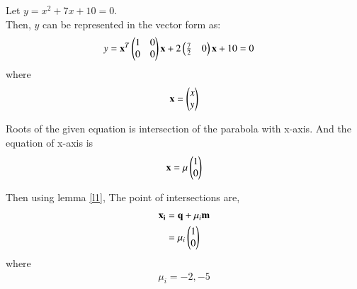 \documentclass[journal,12pt,twocolumn]{IEEEtran}
\begin{document}
Let $y = x^2+7x+10 = 0$. \\Then, $y$ can be represented in the vector form as:
\begin{align}
     y = \mathbf{x}^T\begin{pmatrix}1 & 0 \\ 0 & 0\end{pmatrix}\mathbf{x} + 2\begin{pmatrix}\frac{7}{2} & 0\end{pmatrix}\mathbf{x} + 10 &= 0\label{eq:2}
\end{align}
where 
\begin{align}
    \mathbf{x} = \begin{pmatrix}x\\y\end{pmatrix}
\end{align}

Roots of the given equation is intersection of the parabola with x-axis.
And the equation of x-axis is
\begin{align}
    \mathbf{x}=\mu\begin{pmatrix}1\\0\end{pmatrix}
\end{align}

Then using lemma \ref{l1}, The point of intersections are,
\begin{align}
    \mathbf{x_i}&=\mathbf{q}+\mu_i\mathbf{m}\\
             &=\mu_i\begin{pmatrix}1\\ 0\end{pmatrix}
\end{align}
where 
\begin{align}
    \mu_i = -2, -5
\end{align}
\end{document}
